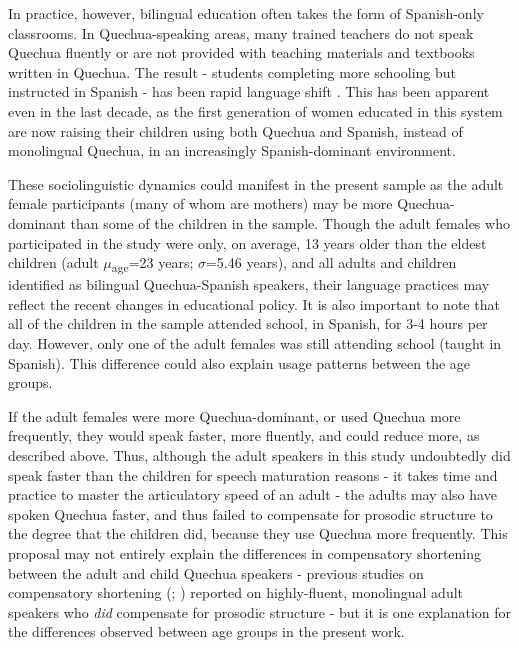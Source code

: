 \documentclass[a4paper,man,floatsintext,natbib,donotrepeattitle, apacite]{apa6}
\begin{document}
In practice, however, bilingual education often takes the form of Spanish-only classrooms. In Quechua-speaking areas, many trained teachers do not speak Quechua fluently or are not provided with teaching materials and textbooks written in Quechua. The result - students completing more schooling but instructed in Spanish - has been rapid language shift \citep{hornbergerLanguageRevitalisationAndes1996}. This has been apparent even in the last decade, as the first generation of women educated in this system are now raising their children using both Quechua and Spanish, instead of monolingual Quechua, in an increasingly Spanish-dominant environment. 

These sociolinguistic dynamics could manifest in the present sample as the adult female participants (many of whom are mothers) may be more Quechua-dominant than some of the children in the sample. Though the adult females who participated in the study were only, on average, 13 years older than the eldest children (adult $\mu$\textsubscript{age}=23 years; $\sigma$=5.46 years), and all adults and children identified as bilingual Quechua-Spanish speakers, their language practices may reflect the recent changes in educational policy. It is also important to note that all of the children in the sample attended school, in Spanish, for 3-4 hours per day. However, only one of the adult females was still attending school (taught in Spanish). This difference could also explain usage patterns between the age groups.

If the adult females were more Quechua-dominant, or used Quechua more frequently, they would speak faster, more fluently, and could reduce more, as described above. Thus, although the adult speakers in this study undoubtedly did speak faster than the children for speech maturation reasons - it takes time and practice to master the articulatory speed of an adult \citep{leeAcousticsChildrenSpeech1999} - the adults may also have spoken Quechua faster, and thus failed to compensate for prosodic structure to the degree that the children did, because they use Quechua more frequently. This proposal may not entirely explain the differences in compensatory shortening between the adult and child Quechua speakers - previous studies on compensatory shortening (\citealt{lehisteTimingUtterancesLinguistic1972}; \citealt{munhallCompensatoryShorteningMonosyllables1992}) reported on highly-fluent, monolingual adult speakers who \textit{did} compensate for prosodic structure - but it is one explanation for the differences observed between age groups in the present work. 
\end{document}
